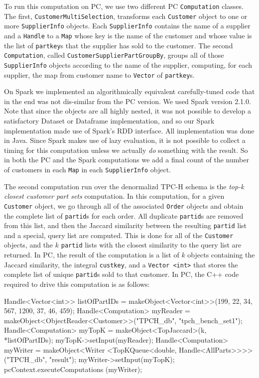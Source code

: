 To run this computation on PC, we use two different PC \texttt{Computation} classes.  The first, 
\texttt{Customer}\-\texttt{MultiSelection}, transforms each 
\texttt{Customer} object to one or more
\texttt{SupplierInfo} objects. Each \texttt{SupplierInfo} contains
the name of a supplier
and a \texttt{Handle} to a \texttt{Map} whose key is the name of the customer and whose value is the list
of \texttt{partkey}s that the supplier has sold to the customer.
The second \texttt{Computation}, called
\texttt{CustomerSupplierPartGroupBy},
groups all of those \texttt{SupplierInfo} objects according to the name of the supplier, computing, for each
supplier, the map from customer name to \texttt{Vector} of \texttt{partkey}s.

On Spark we implemented an algorithmically equivalent
carefully-tuned code that in the
end was not dis-similar from the PC
version.  We used
Spark version
2.1.0.
Note that since the objects are all highly nested, it was not possible to develop a satisfactory
Dataset or Dataframe implementation, and so our Spark implementation made use of Spark's RDD interface.  All
implementation was done in Java.  Since Spark makes use of lazy evaluation, it is not possible to collect a timing
for this computation unless we actually \emph{do} something with the result.  So in both the PC and the Spark computations
we add a final count of the number of customers in each \texttt{Map} in each \texttt{SupplierInfo} object.

The second computation run over the denormalizd TPC-H schema is the \emph{top-k closest customer part sets} computation.
In this computation, 
for a given
\texttt{Customer} object, we go through all of the associated 
\texttt{Order} objects and obtain the complete list of
\texttt{partid}s for each order.  All duplicate \texttt{partid}s are
removed from this list, and then the Jaccard similarity between the resulting \texttt{partid} list and a special, query
list are computed.  This is done for all of the \texttt{Customer} objects, and the $k$ \texttt{partid} lists with the 
closest similarity to the query list are returned.
In PC,
the result of the computation is a list of $k$ objects containing the Jaccard similarity, the integral \texttt{custkey}, and
a \texttt{Vector <int>} that stores the complete list of unique \texttt{partid}s sold to that customer.
In PC, the C++ code required to drive this computation is as follows:
\begin{code}
Handle<Vector<int>> listOfPartIDs = 
    makeObject<Vector<int>>(199, 22, 34, 567, 1200, 37, 46, 459);
Handle<Computation> myReader = 
    makeObject<ObjectReader<Customer>>("TPCH_db", "tpch_bench_set1");
Handle<Computation> myTopK = makeObject<TopJaccard>(k, *listOfPartIDs);
myTopK->setInput(myReader);
Handle<Computation> myWriter = makeObject<Writer
    <TopKQueue<double, Handle<AllParts>>>>("TPCH_db", "result");
myWriter->setInput(myTopK);
pcContext.executeComputations (myWriter);
\end{code}

